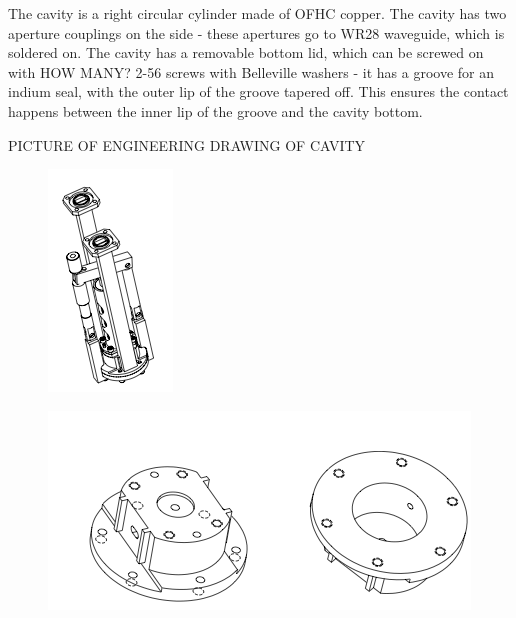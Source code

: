 \documentclass[11pt]{article}
\begin{document}
The cavity is a right circular cylinder made of OFHC copper. The cavity has two aperture couplings on the side - these apertures go to WR28 waveguide, which is soldered on. The cavity has a removable bottom lid, which can be screwed on with HOW MANY? 2-56 screws with Belleville washers - it has a groove for an indium seal, with the outer lip of the groove tapered off. This ensures the contact happens between the inner lip of the groove and the cavity bottom.

PICTURE OF ENGINEERING DRAWING OF CAVITY
\begin{figure}
\includegraphics[scale=1.4]{AxionDrawing3D}
\end{figure}

\begin{figure}
\includegraphics[scale=0.7]{AxionBody}
\end{figure}
\end{document}
